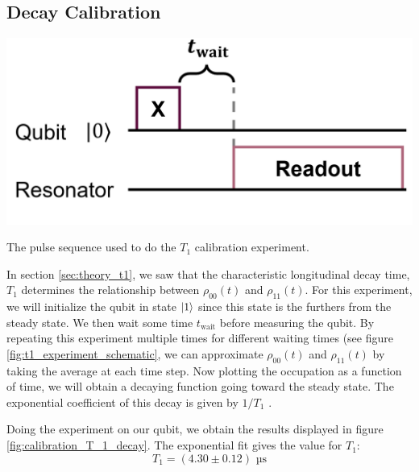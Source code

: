 \subsection{Decay Calibration}\label{sec:calibration_t1}
\begin{marginfigure}
    \centering
    \includegraphics[]{Figs/circuits/t1.png}
    \caption{The pulse sequence used to do the $T_1$ calibration experiment.}
    \label{fig:t1_experiment_schematic}
\end{marginfigure}
In section \ref{sec:theory_t1}, we saw that the characteristic longitudinal decay time, $T_1$ determines the relationship between $\rho_{00}(t)$ and $\rho_{11}(t)$. For this experiment, we will initialize the qubit in state $\ket{1}$ since this state is the furthers from the steady state. We then wait some time $t_{\text{wait}}$ before measuring the qubit. By repeating this experiment multiple times for different waiting times (see figure \ref{fig:t1_experiment_schematic}, we can approximate  $\rho_{00}(t)$ and $\rho_{11}(t)$ by taking the average at each time step. Now plotting the occupation as a function of time, we will obtain a decaying function going toward the steady state. The exponential coefficient of this decay is given by $1/T_1$ \cite{krantz_quantum_2019}. 

Doing the experiment on our qubit, we obtain the results displayed in figure \ref{fig:calibration_T_1_decay}. The exponential fit gives the value for $T_1$:
\begin{equation}
    T_1 = (4.30 \pm 0.12) \text{ µs}
\end{equation}


